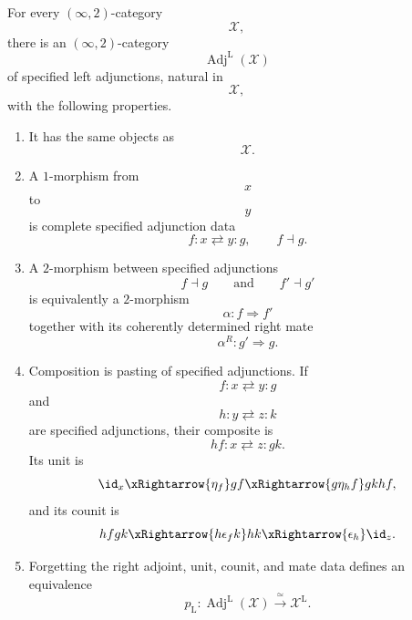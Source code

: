 \begin{theorem}
\label{thm:specified-adjunction-resolution}
For every $(\infty,2)$-category
\[
    \mathcal X,
\]
there is an $(\infty,2)$-category
\[
    \operatorname{Adj}^{\mathrm L}(\mathcal X)
\]
of specified left adjunctions, natural in
\[
    \mathcal X,
\]
with the following properties.

\begin{enumerate}[label=(\roman*)]
    \item It has the same objects as
    \[
        \mathcal X.
    \]

    \item A $1$-morphism from
    \[
        x
    \]
    to
    \[
        y
    \]
    is complete specified adjunction data
    \[
        f
        \colon
        x
        \rightleftarrows
        y
        \colon
        g,
        \qquad
        f\dashv g.
    \]

    \item A $2$-morphism between specified adjunctions
    \[
        f\dashv g
        \qquad\text{and}\qquad
        f'\dashv g'
    \]
    is equivalently a $2$-morphism
    \[
        \alpha
        \colon
        f
        \Longrightarrow
        f'
    \]
    together with its coherently determined right mate
    \[
        \alpha^R
        \colon
        g'
        \Longrightarrow
        g.
    \]

    \item Composition is pasting of specified adjunctions. If
    \[
        f
        \colon
        x
        \rightleftarrows
        y
        \colon
        g
    \]
    and
    \[
        h
        \colon
        y
        \rightleftarrows
        z
        \colon
        k
    \]
    are specified adjunctions, their composite is
    \[
        hf
        \colon
        x
        \rightleftarrows
        z
        \colon
        gk.
    \]
    Its unit is
    \[
        \id_x
        \xRightarrow{\eta_f}
        gf
        \xRightarrow{g\eta_h f}
        gkhf,
    \]
    and its counit is
    \[
        hfgk
        \xRightarrow{h\epsilon_f k}
        hk
        \xRightarrow{\epsilon_h}
        \id_z.
    \]

    \item Forgetting the right adjoint, unit, counit, and mate data
    defines an equivalence
    \[
        p_{\mathrm L}
        \colon
        \operatorname{Adj}^{\mathrm L}(\mathcal X)
        \xrightarrow{\;\simeq\;}
        \mathcal X^{\mathrm L}.
    \]
\end{enumerate}
\end{theorem}

